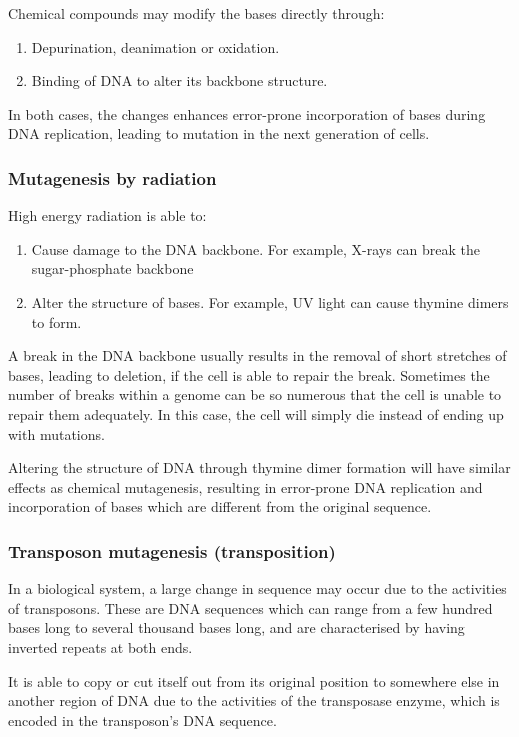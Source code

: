 \documentclass[11pt]{article}
\begin{document}
Chemical compounds may modify the bases directly through:
\begin{enumerate}
\item Depurination, deanimation or oxidation.
\item Binding of DNA to alter its backbone structure.
\end{enumerate}

In both cases, the changes enhances error-prone incorporation of bases during DNA replication, leading to mutation in the next generation of cells.

\newpage
\subsubsection{Mutagenesis by radiation}
\label{sec:orgcfb754e}
High energy radiation is able to:
\begin{enumerate}
\item Cause damage to the DNA backbone. For example, X-rays can break the sugar-phosphate backbone
\item Alter the structure of bases. For example, UV light can cause thymine dimers to form.
\end{enumerate}

A break in the DNA backbone usually results in the removal of short stretches of bases, leading to deletion, if the cell is able to repair the break. Sometimes the number of breaks within a genome can be so numerous that the cell is unable to repair them adequately. In this case, the cell will simply die instead of ending up with mutations.


Altering the structure of DNA through thymine dimer formation will have similar effects as chemical mutagenesis, resulting in error-prone DNA replication and incorporation of bases which are different from the original sequence.
\subsubsection{Transposon mutagenesis (transposition)}
\label{sec:org29f3c64}
In a biological system, a large change in sequence may occur due to the activities of transposons. These are DNA sequences which can range from a few hundred bases long to several thousand bases long, and are characterised by having inverted repeats at both ends.


It is able to copy or cut itself out from its original position to somewhere else in another region of DNA due to the activities of the transposase enzyme, which is encoded in the transposon's DNA sequence.
\end{document}
